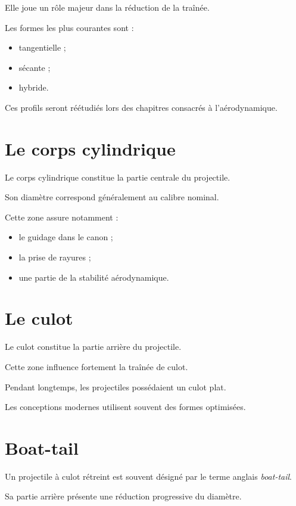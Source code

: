 Elle joue un rôle majeur dans la réduction de la traînée.

Les formes les plus courantes sont :

\begin{itemize}
    \item tangentielle ;
    \item sécante ;
    \item hybride.
\end{itemize}

Ces profils seront réétudiés lors des chapitres consacrés à l'aérodynamique.

\section{Le corps cylindrique}

Le corps cylindrique constitue la partie centrale du projectile.

Son diamètre correspond généralement au calibre nominal.

Cette zone assure notamment :

\begin{itemize}
    \item le guidage dans le canon ;
    \item la prise de rayures ;
    \item une partie de la stabilité aérodynamique.
\end{itemize}

\section{Le culot}

Le culot constitue la partie arrière du projectile.

Cette zone influence fortement la traînée de culot.

Pendant longtemps, les projectiles possédaient un culot plat.

Les conceptions modernes utilisent souvent des formes optimisées.

\section{Boat-tail}

Un projectile à culot rétreint est souvent désigné par le terme anglais
\emph{boat-tail}.

Sa partie arrière présente une réduction progressive du diamètre.

